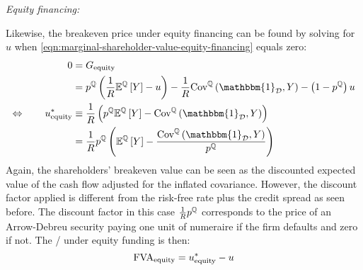 \documentclass[main.tex]{subfiles}
\begin{document}
            \noindent
            \textit{Equity financing:} \par
            Likewise, the breakeven price under equity financing can be found by solving for $u$
            when \cref{eqn:marginal-shareholder-value-equity-financing} equals zero:
                \begin{align}
                    0 &= G_{\text{equity}} 
                        \nonumber \\
                    &=
                        p^{\mathbb{Q}} \left(
                            \discountfactor
                            \mathbb{E}^{\mathbb{Q}}\left[Y\right]
                            - u
                        \right)
                        -
                        \discountfactor
                        \text{Cov}^{\mathbb{Q}}\left(\mathbbm{1}_{\mathcal{D}}, Y\right) 
                        - 
                        \left(
                            1
                            -
                            p^{\mathbb{Q}}
                        \right)
                        u 
                        \nonumber \\
                    \Leftrightarrow \qquad
                    u_{\text{equity}}^{\ast}
                    &\equiv
                        \discountfactor
                        \left(
                            p^{\mathbb{Q}}
                            \mathbb{E}^{\mathbb{Q}}\left[Y\right]
                            -
                            \text{Cov}^{\mathbb{Q}}\left(\mathbbm{1}_{\mathcal{D}}, Y\right) 
                        \right)
                        \nonumber \\
                    &= 
                        \discountfactor
                        p^{\mathbb{Q}}
                        \left(
                            \mathbb{E}^{\mathbb{Q}}\left[Y\right]
                            -
                            \frac{
                                \text{Cov}^{\mathbb{Q}}\left(\mathbbm{1}_{\mathcal{D}}, Y\right)
                            }{
                                p^{\mathbb{Q}}  
                            }  
                        \right)
                    \label{eqn:shareholders-breakeven-equity-financing}
                \end{align}
            Again, the shareholders' breakeven value can be seen as the discounted expected value of the cash flow
            adjusted for the inflated covariance.
            However, the discount factor applied is different from the risk-free rate plus the credit spread as seen before.
            The discount factor in this case $\frac{1}{R} p^{\mathbb{Q}}$ corresponds to 
            the price of an Arrow-Debreu security paying one unit of numeraire if the firm defaults and zero if not.
            The \FVA/ under equity funding is then:
                \begin{equation}
                    \FVA/_{\text{equity}} 
                        = u^{\ast}_{\text{equity}} - u
                    \label{eqn:fva-equity-financing}
                \end{equation}
\end{document}
